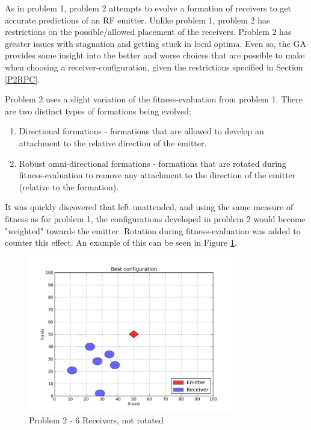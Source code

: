 \documentclass[10pt,a4paper]{book}
\begin{document}
\label{RP2G}

As in problem 1, problem 2 attempts to evolve a formation of receivers to get accurate predictions of an \gls{RF} emitter. Unlike problem 1, problem 2 has restrictions on the possible/allowed placement of the receivers. Problem 2 has greater issues with stagnation and getting stuck in local optima. Even so, the \gls{GA} provides some insight into the better and worse choices that are possible to make when choosing a receiver-configuration, given the restrictions specified in Section \ref{P2RPC}. 

Problem 2 uses a slight variation of the fitness-evaluation from problem 1. There are two distinct types of formations being evolved:



\begin{enumerate}
\item Directional formations - formations that are allowed to develop an attachment to the relative direction of the emitter.
\item Robust omni-directional formations - formations that are rotated during fitness-evaluation to remove any attachment to the direction of the emitter (relative to the formation).
\end{enumerate}

It was quickly discovered that left unattended, and using the same measure of fitness as for problem 1, the configurations developed in problem 2 would become "weighted" towards the emitter. Rotation during fitness-evaluation was added to counter this effect. An example of this can be seen in Figure \ref{problem2norotaterecv6}.

\begin{figure}[H]
\centering
\includegraphics[width=90mm]{Problem2NoRotateRecv6_3.jpg}
\caption{Problem 2 - 6 Receivers, not rotated}
\label{problem2norotaterecv6}
\end{figure}
\end{document}
